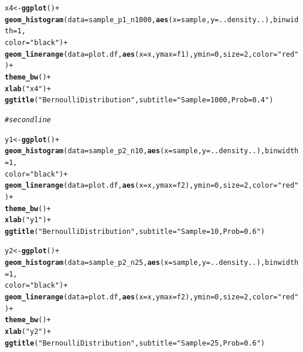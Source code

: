 \documentclass{article}\usepackage[]{graphicx}\usepackage[]{color}
\makeatletter
\newcommand{\hlnum}[1]{\textcolor[rgb]{0.686,0.059,0.569}{#1}}%
\newcommand{\hlstr}[1]{\textcolor[rgb]{0.192,0.494,0.8}{#1}}%
\newcommand{\hlcom}[1]{\textcolor[rgb]{0.678,0.584,0.686}{\textit{#1}}}%
\newcommand{\hlopt}[1]{\textcolor[rgb]{0,0,0}{#1}}%
\newcommand{\hlstd}[1]{\textcolor[rgb]{0.345,0.345,0.345}{#1}}%
\newcommand{\hlkwb}[1]{\textcolor[rgb]{0.69,0.353,0.396}{#1}}%
\newcommand{\hlkwc}[1]{\textcolor[rgb]{0.333,0.667,0.333}{#1}}%
\newcommand{\hlkwd}[1]{\textcolor[rgb]{0.737,0.353,0.396}{\textbf{#1}}}%
\newenvironment{kframe}{%
 \def\at@end@of@kframe{}%
 \ifinner\ifhmode%
  \def\at@end@of@kframe{\end{minipage}}%
  \begin{minipage}{\columnwidth}%
 \fi\fi%
 \def\FrameCommand##1{\hskip\@totalleftmargin \hskip-\fboxsep
 \colorbox{shadecolor}{##1}\hskip-\fboxsep
     \hskip-\linewidth \hskip-\@totalleftmargin \hskip\columnwidth}%
 \MakeFramed {\advance\hsize-\width
   \@totalleftmargin\z@ \linewidth\hsize
   \@setminipage}}%
 {\par\unskip\endMakeFramed%
 \at@end@of@kframe}
\newenvironment{knitrout}{}{} %
\makeatother
\begin{document}
\begin{enumerate}
\begin{enumerate}
\begin{knitrout}
\begin{kframe}
\begin{alltt}
                \hlstd{x4}\hlkwb{<-}\hlkwd{ggplot}\hlstd{()}\hlopt{+}
          \hlkwd{geom_histogram}\hlstd{(}\hlkwc{data} \hlstd{= sample_p1_n1000,} \hlkwd{aes}\hlstd{(}\hlkwc{x} \hlstd{= sample,} \hlkwc{y}\hlstd{=..density..),} \hlkwc{binwidth}\hlstd{=}\hlnum{1}\hlstd{,}
                         \hlkwc{color}\hlstd{=}\hlstr{"black"}\hlstd{)}\hlopt{+}
          \hlkwd{geom_linerange}\hlstd{(}\hlkwc{data}\hlstd{=plot.df,} \hlkwd{aes}\hlstd{(}\hlkwc{x}\hlstd{=x,} \hlkwc{ymax} \hlstd{= f1),} \hlkwc{ymin} \hlstd{=} \hlnum{0}\hlstd{,} \hlkwc{size}\hlstd{=}\hlnum{2}\hlstd{,} \hlkwc{color}\hlstd{=}\hlstr{"red"}\hlstd{)}\hlopt{+}
          \hlkwd{theme_bw}\hlstd{()} \hlopt{+}
          \hlkwd{xlab}\hlstd{(}\hlstr{"x4"}\hlstd{)}\hlopt{+}
          \hlkwd{ggtitle}\hlstd{(}\hlstr{"Bernoulli Distribution"}\hlstd{,}\hlkwc{subtitle} \hlstd{=} \hlstr{"Sample = 1000, Prob =0.4"}\hlstd{)}

\hlcom{#second line}

                \hlstd{y1}\hlkwb{<-}\hlkwd{ggplot}\hlstd{()}\hlopt{+}
          \hlkwd{geom_histogram}\hlstd{(}\hlkwc{data} \hlstd{= sample_p2_n10,} \hlkwd{aes}\hlstd{(}\hlkwc{x} \hlstd{= sample,} \hlkwc{y}\hlstd{=..density..),} \hlkwc{binwidth}\hlstd{=}\hlnum{1}\hlstd{,}
                         \hlkwc{color}\hlstd{=}\hlstr{"black"}\hlstd{)}\hlopt{+}
          \hlkwd{geom_linerange}\hlstd{(}\hlkwc{data}\hlstd{=plot.df,} \hlkwd{aes}\hlstd{(}\hlkwc{x}\hlstd{=x,} \hlkwc{ymax} \hlstd{= f2),} \hlkwc{ymin} \hlstd{=} \hlnum{0}\hlstd{,} \hlkwc{size}\hlstd{=}\hlnum{2}\hlstd{,} \hlkwc{color}\hlstd{=}\hlstr{"red"}\hlstd{)}\hlopt{+}
          \hlkwd{theme_bw}\hlstd{()} \hlopt{+}
          \hlkwd{xlab}\hlstd{(}\hlstr{"y1"}\hlstd{)}\hlopt{+}
          \hlkwd{ggtitle}\hlstd{(}\hlstr{"Bernoulli Distribution"}\hlstd{,}\hlkwc{subtitle} \hlstd{=} \hlstr{"Sample = 10, Prob =0.6"}\hlstd{)}

                \hlstd{y2}\hlkwb{<-}\hlkwd{ggplot}\hlstd{()}\hlopt{+}
          \hlkwd{geom_histogram}\hlstd{(}\hlkwc{data} \hlstd{= sample_p2_n25,} \hlkwd{aes}\hlstd{(}\hlkwc{x} \hlstd{= sample,} \hlkwc{y}\hlstd{=..density..),} \hlkwc{binwidth}\hlstd{=}\hlnum{1}\hlstd{,}
                         \hlkwc{color}\hlstd{=}\hlstr{"black"}\hlstd{)}\hlopt{+}
          \hlkwd{geom_linerange}\hlstd{(}\hlkwc{data}\hlstd{=plot.df,} \hlkwd{aes}\hlstd{(}\hlkwc{x}\hlstd{=x,} \hlkwc{ymax} \hlstd{= f2),} \hlkwc{ymin} \hlstd{=} \hlnum{0}\hlstd{,} \hlkwc{size}\hlstd{=}\hlnum{2}\hlstd{,} \hlkwc{color}\hlstd{=}\hlstr{"red"}\hlstd{)}\hlopt{+}
          \hlkwd{theme_bw}\hlstd{()} \hlopt{+}
          \hlkwd{xlab}\hlstd{(}\hlstr{"y2"}\hlstd{)}\hlopt{+}
          \hlkwd{ggtitle}\hlstd{(}\hlstr{"Bernoulli Distribution"}\hlstd{,}\hlkwc{subtitle} \hlstd{=} \hlstr{"Sample = 25, Prob =0.6"}\hlstd{)}


\end{alltt}
\end{kframe}
\end{knitrout}
\end{enumerate}
\end{enumerate}
\end{document}
